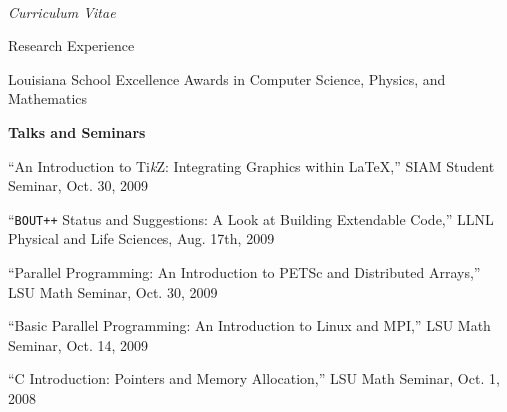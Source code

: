 \documentclass[10pt]{article}
\newenvironment{sublist}{%
	\begin{list}{}{%
		\setlength{\itemsep}{0em}\setlength{\parsep}{0em}%
		\setlength{\topsep}{0em}\setlength{\parskip}{0em}%
	}%
}%
{ \end{list} }
\newenvironment{subbulletlist}{%
	\begin{list}{\labelitemii}{%
		\setlength{\topsep}{\itemsep}\setlength{\parskip}{\parsep}%
	}%
}%
{ \end{list} }
\newcommand{\TikZ}{Ti\emph{k}Z}
\begin{document}
\begin{cv}{\name\\{\large \itshape Curriculum Vitae}}
\begin{cvlist}{Research Experience}
\begin{subbulletlist}
		\item Louisiana School Excellence Awards in Computer Science, Physics, and Mathematics
	\end{subbulletlist}
	
	\item \textbf{Talks and Seminars}
	\begin{subbulletlist}
		\item ``An Introduction to \TikZ: Integrating Graphics within \LaTeX,'' SIAM Student Seminar, Oct. 30, 2009
		\item ``\texttt{BOUT++} Status and Suggestions: A Look at Building Extendable Code,'' LLNL Physical and Life Sciences, Aug. 17th, 2009
		\item ``Parallel Programming: An Introduction to PETSc and Distributed Arrays,'' LSU  Math Seminar, Oct. 30, 2009
		\item ``Basic Parallel Programming: An Introduction to Linux and MPI,'' LSU Math Seminar, Oct. 14, 2009
		\item ``C Introduction: Pointers and Memory Allocation,'' LSU Math Seminar, Oct. 1, 2008
	\end{subbulletlist}
\end{cvlist}
\setlength{\cvlabelwidth}{\oldcvlabelwidth}


\end{cv}
\end{document}
